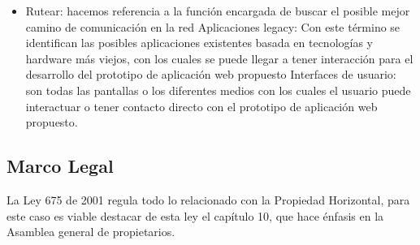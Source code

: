 \begin{itemize}
\item Rutear: hacemos referencia a la función encargada de buscar el posible mejor camino de comunicación en la red
Aplicaciones legacy: Con este término se identifican las posibles aplicaciones existentes basada en tecnologías y hardware más viejos, con los cuales se puede llegar a tener interacción para el desarrollo del prototipo de aplicación web propuesto
Interfaces de usuario: son todas las pantallas o los diferentes medios con los cuales el usuario puede interactuar o tener contacto directo con el prototipo de aplicación web propuesto.
\end{itemize}

\subsection{Marco Legal}

La Ley 675 de 2001 regula todo lo relacionado con la Propiedad Horizontal, para este caso es viable destacar de esta ley el capítulo 10, que hace énfasis en la Asamblea general de propietarios.\cite{WEB6} 

